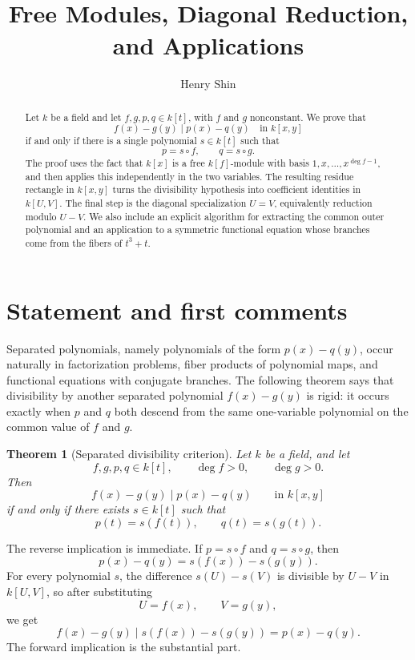 \documentclass[11pt]{article}
\title{\vspace{-2em}{\Huge\bfseries Divisibility of Separated Polynomials}\\[0.45em]
{\Large Free Modules, Diagonal Reduction, and Applications}}
\author{Henry Shin}
\date{}
\theoremstyle{plain}
\newtheorem{theorem}{Theorem}[section]
\theoremstyle{definition}
\theoremstyle{remark}
\newcommand{\U}{U}
\newcommand{\V}{V}
\begin{document}
\maketitle

\begin{abstract}
Let \(k\) be a field and let \(f,g,p,q\in k[t]\), with \(f\) and \(g\) nonconstant. We prove that
\[
    f(x)-g(y)\mid p(x)-q(y) \quad \text{in } k[x,y]
\]
if and only if there is a single polynomial \(s\in k[t]\) such that
\[
    p=s\circ f, \qquad q=s\circ g.
\]
The proof uses the fact that \(k[x]\) is a free \(k[f]\)-module with basis
\(1,x,\dots,x^{\deg f-1}\), and then applies this independently in the two variables. The resulting residue rectangle in \(k[x,y]\) turns the divisibility hypothesis into coefficient identities in \(k[U,V]\). The final step is the diagonal specialization \(U=V\), equivalently reduction modulo \(U-V\). We also include an explicit algorithm for extracting the common outer polynomial and an application to a symmetric functional equation whose branches come from the fibers of \(t^3+t\).
\end{abstract}

\section{Statement and first comments}

Separated polynomials, namely polynomials of the form \(p(x)-q(y)\), occur naturally in factorization problems, fiber products of polynomial maps, and functional equations with conjugate branches. The following theorem says that divisibility by another separated polynomial \(f(x)-g(y)\) is rigid: it occurs exactly when \(p\) and \(q\) both descend from the same one-variable polynomial on the common value of \(f\) and \(g\).

\begin{theorem}[Separated divisibility criterion]\label{thm:main}
Let \(k\) be a field, and let
\[
    f,g,p,q\in k[t],
    \qquad \deg f>0,
    \qquad \deg g>0.
\]
Then
\[
    f(x)-g(y)\mid p(x)-q(y)
    \qquad \text{in } k[x,y]
\]
if and only if there exists \(s\in k[t]\) such that
\[
    p(t)=s(f(t)),
    \qquad
    q(t)=s(g(t)).
\]
\end{theorem}

The reverse implication is immediate. If \(p=s\circ f\) and \(q=s\circ g\), then
\[
    p(x)-q(y)=s(f(x))-s(g(y)).
\]
For every polynomial \(s\), the difference \(s(\U)-s(\V)\) is divisible by \(\U-\V\) in \(k[\U,\V]\), so after substituting
\[
    \U=f(x), \qquad \V=g(y),
\]
we get
\[
    f(x)-g(y)
    \mid
    s(f(x))-s(g(y))
    =p(x)-q(y).
\]
The forward implication is the substantial part.
\end{document}
